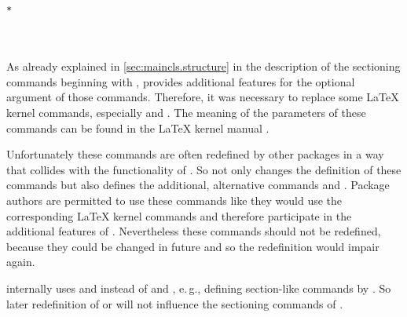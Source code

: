 \begin{Declaration}
  \\
  \\
  \\
  \\
  \texttt{*}\\
  \\
  \\
\end{Declaration}
%
%
%
%
As already explained in \autoref{sec:maincls.structure} in
the description of the sectioning commands beginning with
, \KOMAScript{} provides additional
features for the optional argument of those commands. Therefore, it was
necessary to replace some \LaTeX{} kernel commands, especially 
 and
%
. The meaning of the parameters of these
commands can be found in the \LaTeX{} kernel manual \cite{latex:source2e}.

Unfortunately these commands are often redefined by other packages in a way
that collides with the functionality of \KOMAScript. So \KOMAScript{} not only
changes the definition of these commands but also defines the additional,
alternative commands  and . Package
authors are permitted to use these commands like they would use the
corresponding \LaTeX{} kernel commands and therefore participate in the
additional features of \KOMAScript. Nevertheless these commands should not be
redefined, because they could be changed in future and so the redefinition would
impair \KOMAScript{} again.

\KOMAScript{} internally uses  and
 instead of  and ,
e.\,g., defining section-like commands by . So
later redefinition of  or  will not
influence the sectioning commands of \KOMAScript.

